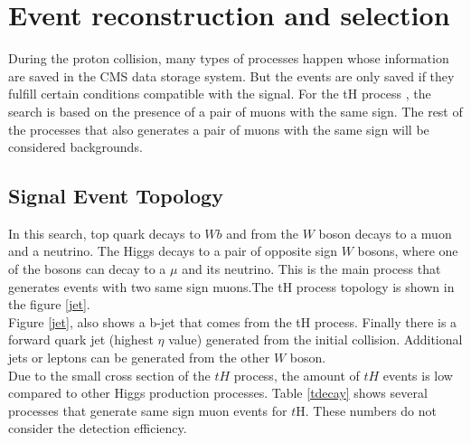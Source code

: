 \chapter{Event reconstruction and selection}
During the proton collision, many types of processes happen whose information are saved in the CMS data storage system. But the events are only saved if they fulfill certain conditions compatible with the signal. 
For the tH process , the search is based on the presence of  a pair of muons with the same sign. The rest of the processes that also generates a pair of muons with the same sign will be considered backgrounds.  
\section{Signal Event Topology} 
In this search, top quark decays to $Wb$ and from the $W$ boson decays to a muon and a neutrino. The Higgs decays to a pair of opposite sign $W$ bosons, where one of the bosons can decay to a $\mu$ and its neutrino. This is the main process that generates events with two same sign muons.The tH process topology is shown in the figure \ref{jet}.\\

Figure \ref{jet}, also shows a b-jet that comes from the tH process.  Finally there is a forward  quark jet (highest $\eta$ value) generated from the initial collision. Additional jets or leptons can be generated from the other $W$ boson.
\\
	
Due to the small cross section of the $tH$ process, the amount of $tH$ events is low compared to other Higgs production processes. 
Table \ref{tdecay} shows several processes that generate same sign muon events for $t$H. These numbers do not consider the detection efficiency.


